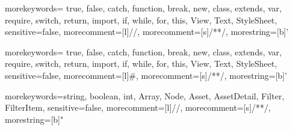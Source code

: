 
\renewcommand{\lstlistingname}{Codice}%
\renewcommand{\lstlistlistingname}{Frammenti di codice}%


 
\lstset{style=mystyle}

{
  morekeywords={ true, false, catch, function, break,	new, class, extends, var, require, switch, return, import, if, while, for, this, View, Text, StyleSheet},
  sensitive=false, %
  morecomment=[l]{//}, %
  morecomment=[s]{/*}{*/}, %
  morestring=[b]' %
}

{
	morekeywords={ true, false, catch, function, break,	new, class, extends, var, require, switch, return, import, if, while, for, this, View, Text, StyleSheet},
	sensitive=false, %
	morecomment=[l]{\#}, %
	morecomment=[s]{/*}{*/}, %
	morestring=[b]' %
}

{
  morekeywords={string, boolean, int, Array, Node, Asset, AssetDetail, Filter, FilterItem},
  sensitive=false, %
  morecomment=[l]{//}, %
  morecomment=[s]{/*}{*/}, %
  morestring=[b]" %
}

